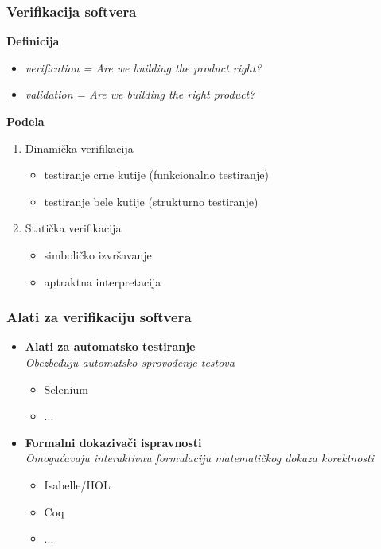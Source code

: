 \documentclass{beamer}
\begin{document}
\begin{frame}
\frametitle{Verifikacija softvera}

\textbf{Definicija}
\begin{itemize}
\item \textit{verification = Are we building the product right?}
\item \textit{validation = Are we building the right product?}
\end{itemize}

\textbf{Podela}
\begin{enumerate}
\item Dinamička verifikacija
\begin{itemize}
\item testiranje crne kutije (funkcionalno testiranje)
\item testiranje bele kutije (strukturno testiranje)
\end{itemize}
\item Statička verifikacija
\begin{itemize}
\item simboličko izvršavanje
\item aptraktna interpretacija
\end{itemize}
\end{enumerate}
\end{frame}


\begin{frame}
\frametitle{Alati za verifikaciju softvera}

\begin{itemize}
\item \textbf{Alati za automatsko testiranje} \\
\textit{Obezbeđuju automatsko sprovođenje testova}
\begin{itemize}
\item Selenium
\item ...
\end{itemize}
\item \textbf{Formalni dokazivači ispravnosti} \\
\textit{Omogućavaju interaktivnu formulaciju matematičkog dokaza korektnosti}
\begin{itemize}
\item Isabelle/HOL
\item Coq
\item ...
\end{itemize}
\end{itemize}
\end{frame}
\end{document}
